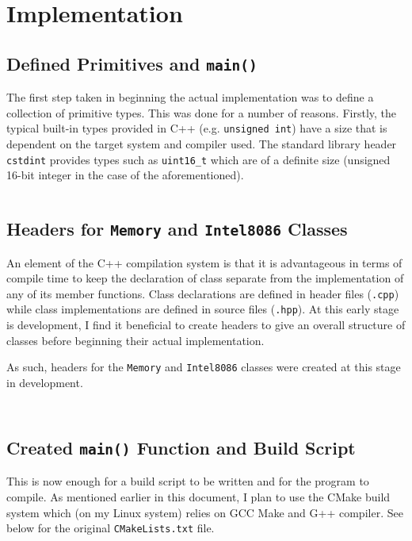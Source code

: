\section{Implementation}

\subsection{Defined Primitives and \texttt{main()}}
    The first step taken in beginning the actual implementation was to define a collection of primitive types. This was done for a number of reasons. Firstly, the typical built-in types provided in C++ (e.g. \texttt{unsigned int}) have a size that is dependent on the target system and compiler used. The standard library header \texttt{cstdint} provides types such as \texttt{uint16\_t} which are of a definite size (unsigned 16-bit integer in the case of the aforementioned).

    \inputminted{c++}{code/primitives.hpp}

\subsection{Headers for \texttt{Memory} and \texttt{Intel8086} Classes}
    An element of the C++ compilation system is that it is advantageous in terms of compile time to keep the declaration of class separate from the implementation of any of its member functions. Class declarations are defined in header files (\texttt{.cpp}) while class implementations are defined in source files (\texttt{.hpp}). At this early stage is development, I find it beneficial to create headers to give an overall structure of classes before beginning their actual implementation.

    As such, headers for the \texttt{Memory} and \texttt{Intel8086} classes were created at this stage in development.

    \inputminted{c++}{code/memory.hpp}

    \inputminted{c++}{code/intel8086.hpp}

\subsection{Created \texttt{main()} Function and Build Script}
    This is now enough for a build script to be written and for the program to compile. As mentioned earlier in this document, I plan to use the CMake build system which (on my Linux system) relies on GCC Make and G++ compiler. See below for the original \texttt{CMakeLists.txt} file.

